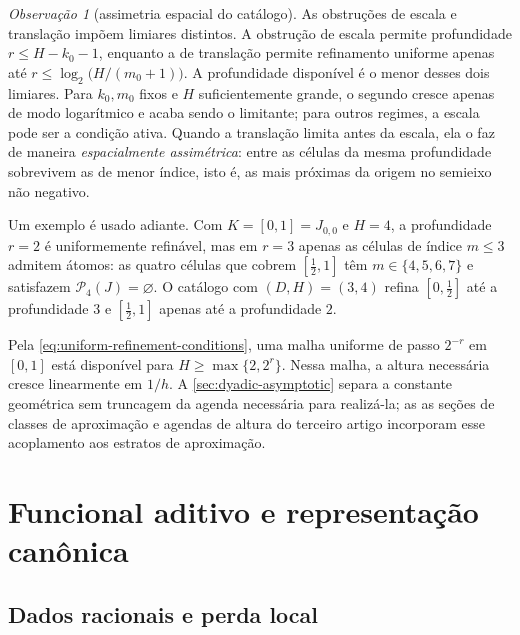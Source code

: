 \documentclass[11pt,a4paper]{article}
\theoremstyle{definition}
\theoremstyle{remark}
\newtheorem{remark}[theorem]{Observação}
\newcommand{\Pairs}{\mathcal{P}}
\begin{document}
\begin{remark}[assimetria espacial do catálogo]
\label{rem:asymmetry}
As obstruções de escala e translação impõem limiares distintos. A obstrução de escala permite profundidade
$r\le H-k_0-1$, enquanto a de translação permite refinamento uniforme apenas
até $r\le\log_2\bigl(H/(m_0+1)\bigr)$. A profundidade disponível é o menor
desses dois limiares. Para $k_0,m_0$ fixos e $H$ suficientemente grande, o
segundo cresce apenas de modo logarítmico e acaba sendo o limitante; para
outros regimes, a escala pode ser a condição ativa. Quando a translação
limita antes da escala, ela o faz de maneira \emph{espacialmente assimétrica}:
entre as células da mesma profundidade sobrevivem as de menor índice, isto é,
as mais próximas da origem no semieixo não negativo.

Um exemplo é usado adiante. Com $K=[0,1]=J_{0,0}$ e $H=4$, a profundidade
$r=2$ é uniformemente refinável, mas em $r=3$ apenas as células de índice
$m\le3$ admitem átomos: as quatro células que cobrem $[\tfrac12,1]$ têm
$m\in\{4,5,6,7\}$ e satisfazem $\Pairs_4(J)=\varnothing$. O catálogo com
$(D,H)=(3,4)$ refina $[0,\tfrac12]$ até a profundidade $3$ e
$[\tfrac12,1]$ apenas até a profundidade $2$.

Pela \eqref{eq:uniform-refinement-conditions}, uma malha uniforme de passo
$2^{-r}$ em $[0,1]$ está disponível para
$H\ge\max\{2,2^r\}$. Nessa malha, a altura necessária cresce linearmente em $1/h$. A \cref{sec:dyadic-asymptotic} separa a constante geométrica sem
truncagem da agenda necessária para realizá-la; as
as seções de classes de aproximação e agendas de altura do terceiro artigo incorporam esse acoplamento
aos estratos de aproximação.
\end{remark}

\section{Funcional aditivo e representação canônica}
\label{sec:functional}

\subsection{Dados racionais e perda local}
\end{document}
